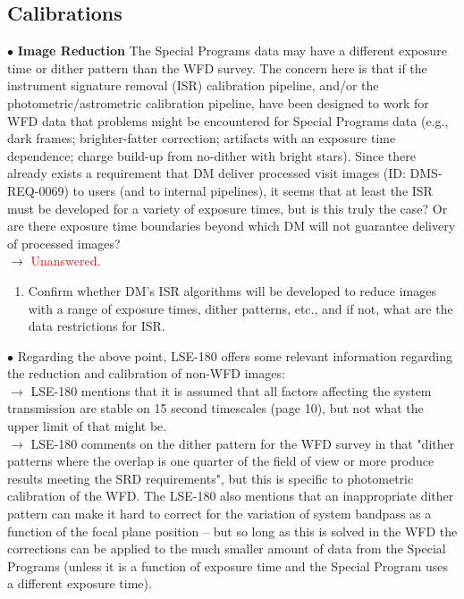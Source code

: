 \documentclass[DM,lsstdraft,toc]{lsstdoc}
\begin{document}
\subsection{Calibrations}\label{ssec:issues_calibrations}

$\bullet$ \textbf{Image Reduction} The Special Programs data may have a different exposure time or dither pattern than the WFD survey. The concern here is that if the instrument signature removal (ISR) calibration pipeline, and/or the photometric/astrometric calibration pipeline, have been designed to work for WFD data that problems might be encountered for Special Programs data (e.g., dark frames; brighter-fatter correction; artifacts with an exposure time dependence; charge build-up from no-dither with bright stars). Since there already exists a requirement that DM deliver processed visit images (ID: DMS-REQ-0069) to users (and to internal pipelines), it seems that at least the ISR must be developed for a variety of exposure times, but is this truly the case? Or are there exposure time boundaries beyond which DM will not guarantee delivery of processed images? \\
$\rightarrow$ \textcolor{red}{Unanswered.}
\begin{enumerate}[resume,topsep=-10pt,label= \textbf{Concern \Roman*.}] \item \label{C12} Confirm whether DM's ISR algorithms will be developed to reduce images with a range of exposure times, dither patterns, etc., and if not, what are the data restrictions for ISR. \end{enumerate}

$\bullet$ Regarding the above point, LSE-180 offers some relevant information regarding the reduction and calibration of non-WFD images: \\
$\rightarrow$ LSE-180 mentions that it is assumed that all factors affecting the system transmission are stable on 15 second timescales (page 10), but not what the upper limit of that might be. \\
$\rightarrow$ LSE-180 comments on the dither pattern for the WFD survey in that "dither patterns where the overlap is one quarter of the field of view or more produce results meeting the SRD requirements", but this is specific to photometric calibration of the WFD. The LSE-180 also mentions that an inappropriate dither pattern can make it hard to correct for the variation of system bandpass as a function of the focal plane position -- but so long as this is solved in the WFD the corrections can be applied to the much smaller amount of data from the Special Programs (unless it is a function of exposure time and the Special Program uses a different exposure time).
\end{document}
